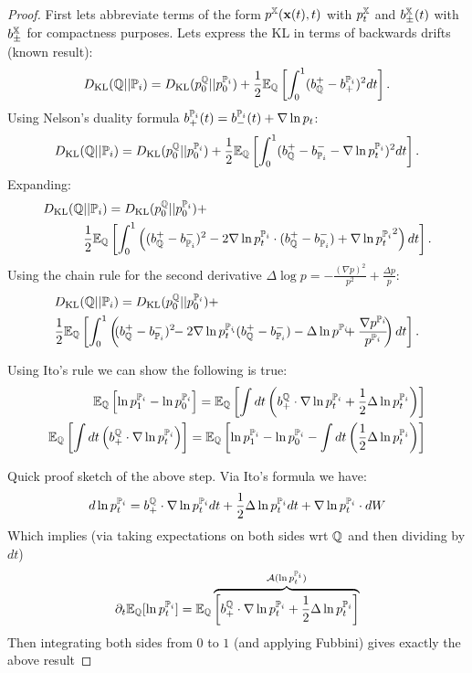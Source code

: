 \documentclass[a4paper,12pt,twoside,openright]{report}
\theoremstyle{definition}
\begin{document}
\begin{proof}
First lets  abbreviate  terms of the form $p^{\X}(\rvx(t), t)$ with $p^{\X}_t$ and $b^{\X}_{\pm}(t)$ with $b^{\X}_{\pm}$ for compactness purposes. Lets express the KL in terms of backwards drifts (known result):
\begin{align}
\KL(\Q||{\P_{i}}) = \KL( p_0^{\Q}|| p_0^{{\P_{i}}}) + \frac{1}{2}\E_{\Q}\left[\int_0^1 ( b_\Q^{+} - b^{\P_{i}}_{+})^2 dt\right].
\end{align}
Using Nelson's duality formula $b^{\P_{i}}_+(t) =b^{\P_{i}}_-(t) + \nabla\log p_t$:
\begin{align}
\KL(\Q||{\P_{i}}) = \KL( p_0^{\Q}|| p_0^{{\P_{i}}}) + \frac{1}{2}\E_{\Q}\left[\int_0^1 ( b_\Q^{+} - b_{\P_{i}}^{-} - \nabla\log p_t^{\P_{i}})^2 dt\right].
\end{align}
Expanding:
\begin{align*}
\KL(\Q&||{\P_{i}}) = \KL( p_0^{\Q}|| p_0^{{\P_{i}}}) +\\ &\frac{1}{2}\E_{\Q}\left[\int_0^1 \left(( b_\Q^{+} - b_{\P_{i}}^{-})^2 - 2\nabla\log p_t^{\P_{i}} \cdot ( b_\Q^{+} - b_{\P_{i}}^{-}) + {\nabla\log p_t^{\P_{i}}}^2 \right)dt\right].
\end{align*}
Using the chain rule for the second derivative $\Delta \log  p = -\frac{(\nabla p)^2}{ p^2}  + \frac{\Delta  p}{ p}$:
\begin{align*}
&\KL(\Q||{\P_{i}}) =\KL( p_0^{\Q}|| p_0^{{\P_{i}}}) +\\ &\frac{1}{2}\E_{\Q}\left[\int_0^1 \left(\!\!( b_\Q^{+} - b_{\P_{i}}^{-})^2 \!\!- 2\nabla\log p_t^{\P_{i}}\!\!\!\cdot \!( b_\Q^{+} - b_{\P_{i}}^{-}) - \Delta \log  p^{\P_{i}}\!\!\!+ \frac{\nabla  p^{\P_{i}}}{ p^{\P_{i}}}\!\!\right)dt\right].
\end{align*}

Using Ito's rule we can show the following is true: 
\begin{align*}
\E_\Q\left[\log p^{\P_{i}}_1-\log p^{\P_{i}}_0\right] = \E_\Q\left[\int dt \left(b_+^\Q\cdot\nabla\log p_t^{\P_{i}} + \frac{1}{2}\Delta \log p_t^{\P_{i}}\right)\right]\\
\E_\Q\left[\int dt \left(b_+^\Q\cdot\nabla\log p_t^{\P_{i}} \right)\right] = \E_\Q\left[\log p^{\P_{i}}_1-\log p^{\P_{i}}_0 - \int dt \left( \frac{1}{2}\Delta \log p_t^{\P_{i}}\right)\right]
\end{align*}

Quick proof sketch of the above step. Via Ito's formula we have:
\begin{align*}
d\log  p_t^{{\P_{i}}} = b_+^\Q\cdot\nabla\log p_t^{\P_{i}} dt + \frac{1}{2}\Delta \log p_t^{\P_{i}} dt + \nabla \log p_t^{\P_{i}} \cdot dW
\end{align*}
Which implies (via taking expectations on both sides wrt $\Q$ and then dividing by $dt$)
\begin{align*}
\partial_t \E_{\Q}[\log  p_t^{{\P_{i}}}] = \E_{\Q}\overbrace{\left[b_+^\Q\cdot\nabla\log p_t^{\P_{i}} + \frac{1}{2}\Delta \log p_t^{\P_{i}}\right]}^{\mathcal{A}(\log  p_t^{{\P_{i}}})}
\end{align*}
Then integrating both sides from $0$ to $1$ (and applying Fubbini) gives exactly the above result


\end{proof}
\end{document}
